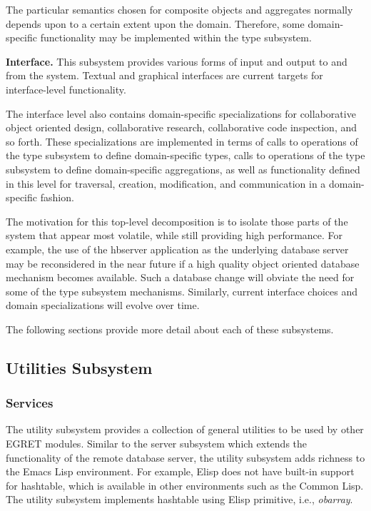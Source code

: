 \begin{itemizenoindent}
  The particular semantics chosen for composite objects and
  aggregates normally depends upon to a certain extent upon the
  domain.  Therefore, some domain-specific functionality may be
  implemented within the type subsystem.

  
\item {\bf Interface.} This subsystem provides various forms of input
  and output to and from the system.  Textual and graphical interfaces
  are current targets for interface-level functionality.
  
  The interface level also contains domain-specific specializations for
  collaborative object oriented design, collaborative research,
  collaborative code inspection, and so forth.  These specializations
  are implemented in terms of calls to operations of the type subsystem
  to define domain-specific types, calls to operations of the type
  subsystem to define domain-specific aggregations, as well as
  functionality defined in this level for traversal, creation,
  modification, and communication in a domain-specific fashion.

\end{itemizenoindent}

The motivation for this top-level decomposition is to isolate those
parts of the system that appear most volatile, while still providing
high performance.  For example, the use of the hbserver application as
the underlying database server may be reconsidered in the near future
if a high quality object oriented database mechanism becomes
available. Such a database change will obviate the need for some of
the type subsystem mechanisms.  Similarly, current interface choices
and domain specializations will evolve over time.

The following sections provide more detail about each of these subsystems. 
\subsection{Utilities Subsystem}

\subsubsection{Services}

The utility subsystem provides a collection of general utilities to be used
by other EGRET modules. Similar to the server subsystem which extends the
functionality of the remote database server, the utility subsystem adds
richness to the Emacs Lisp environment. For example, Elisp does not have
built-in support for hashtable, which is available in other environments
such as the Common Lisp. The utility subsystem implements hashtable using
Elisp primitive, i.e., {\it obarray\/}.

